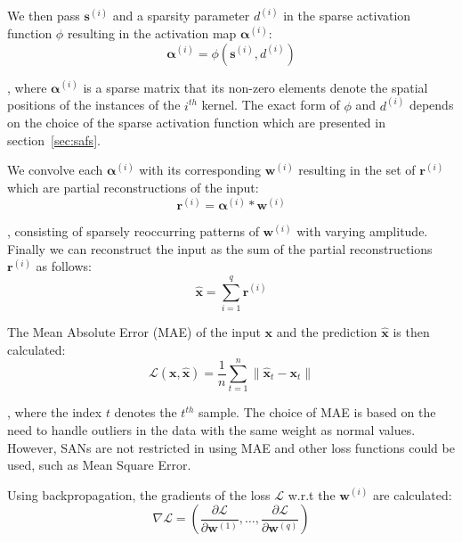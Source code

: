 \documentclass[journal]{IEEEtran}
\begin{document}
We then pass $\bm{s}^{(i)}$ and a sparsity parameter $d^{(i)}$ in the sparse activation function $\phi$ resulting in the activation map $\bm{\alpha}^{(i)}$:
\begin{equation}
	\label{eq:extrema}
	\bm{\alpha}^{(i)} = \phi(\bm{s}^{(i)}, d^{(i)})
\end{equation}

\noindent
, where $\bm{\alpha}^{(i)}$ is a sparse matrix that its non-zero elements denote the spatial positions of the instances of the $i^{th}$ kernel.
The exact form of $\phi$ and $d^{(i)}$ depends on the choice of the sparse activation function which are presented in section~\ref{sec:safs}.

We convolve each $\bm{\alpha}^{(i)}$ with its corresponding $\bm{w}^{(i)}$ resulting in the set of $\bm{r}^{(i)}$ which are partial reconstructions of the input:
\begin{equation}
	\label{eq:reconstructions}
	\bm{r}^{(i)} = \bm{\alpha}^{(i)} * \bm{w}^{(i)}
\end{equation}

\noindent
, consisting of sparsely reoccurring patterns of $\bm{w}^{(i)}$ with varying amplitude.
Finally we can reconstruct the input as the sum of the partial reconstructions $\bm{r}^{(i)}$ as follows:
\begin{equation}
	\label{eq:output1}
	\hat{\bm{x}} = \sum\limits_{i=1}^q \bm{r}^{(i)}
\end{equation}

The Mean Absolute Error (MAE) of the input $\bm{x}$ and the prediction $\hat{\bm{x}}$ is then calculated:
\begin{equation}
	\label{eq:lossfunction}
	\mathcal{L}\left( {\bm{x},\hat{\bm{x}}} \right) = \frac{1}{n}\sum\limits_{t=1}^n \Big\lVert\hat{\bm{x}}_t - \bm{x}_t \Big\rVert
\end{equation}

\noindent
, where the index $t$ denotes the $t^{th}$ sample.
The choice of MAE is based on the need to handle outliers in the data with the same weight as normal values.
However, SANs are not restricted in using MAE and other loss functions could be used, such as Mean Square Error.

Using backpropagation, the gradients of the loss $\mathcal{L}$ w.r.t the $\bm{w}^{(i)}$ are calculated:
\begin{equation}
	\label{eq:backpropagation1}
	\nabla\mathcal{L} = \left( \frac{\partial\mathcal{L}}{\partial\bm{w}^{(1)}},\ldots,\frac{\partial\mathcal{L}}{\partial\bm{w}^{(q)}}\right)
\end{equation}
\end{document}
